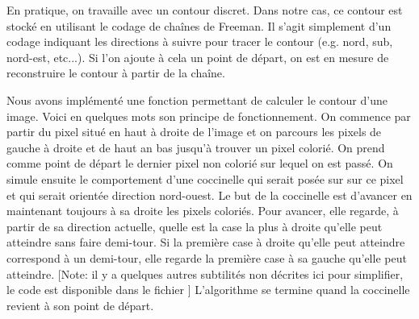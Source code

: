 En pratique, on travaille avec un contour discret. 
Dans notre cas, ce contour est stocké en utilisant le codage 
de chaînes de Freeman.
Il s'agit simplement d'un codage indiquant les directions à suivre 
pour tracer le contour (e.g.\/ nord, sub, nord-est, etc...).
Si l'on ajoute à cela un point de départ, on est en mesure de 
reconstruire le contour à partir de la chaîne.


Nous avons implémenté une fonction permettant de calculer le 
contour d'une image.
Voici en quelques mots son principe de fonctionnement. 
On commence par partir du pixel situé en haut à droite de l'image 
et on parcours les pixels de gauche à droite et de haut an bas 
jusqu'à trouver un pixel colorié. 
On prend comme point de départ le dernier pixel non colorié sur lequel 
on est passé.
On simule ensuite le comportement d'une coccinelle qui serait posée sur 
sur ce pixel et qui serait orientée direction nord-ouest. 
Le but de la coccinelle est d'avancer en maintenant toujours à sa 
droite les pixels coloriés. 
Pour avancer, elle regarde, à partir de sa direction actuelle, quelle 
est la case la plus à droite qu'elle peut atteindre sans faire demi-tour.
Si la première case à droite qu'elle peut atteindre correspond à un demi-tour, 
elle regarde la première case à sa gauche qu'elle peut atteindre.
[Note: il y a quelques autres subtilités non décrites ici pour simplifier, 
le code est disponible dans le fichier ]
L'algorithme se termine quand la coccinelle revient à son point de départ.

